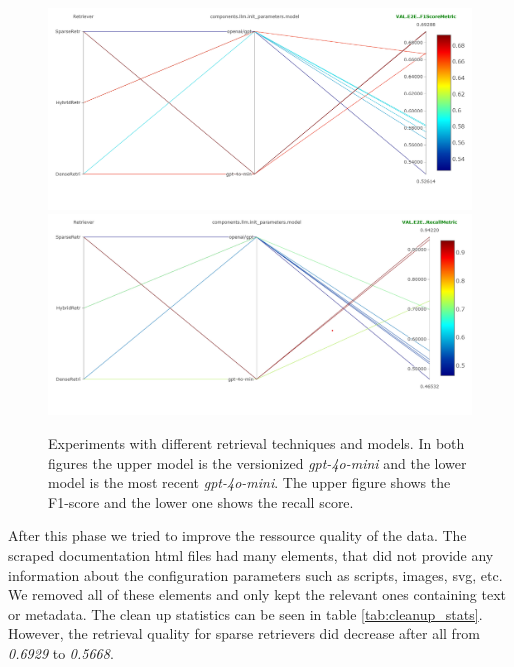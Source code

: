 \begin{figure}[!ht]
    \centering
    \includegraphics[width=\textwidth]{images/RetrievalTypes-vs-LLM-f1.png}\\[6pt]
    \includegraphics[width=\textwidth]{images/RetrievalTypes-vs-LLM-Recall.png}
    \caption{Experiments with different retrieval techniques and models. In both figures the upper model is the versionized \textit{gpt-4o-mini} and the lower model is the most recent \textit{gpt-4o-mini}. The upper figure shows the F1-score and the lower one shows the recall score.}
    \label{fig:conf-phase-0-retrievers}
\end{figure}

After this phase we tried to improve the ressource quality of the data. The scraped documentation html files had many elements, that did not provide any information about the configuration parameters such as scripts, images, svg, etc. We removed all of these elements and only kept the relevant ones containing text or metadata. The clean up statistics can be seen in table \ref{tab:cleanup_stats}. However, the retrieval quality for sparse retrievers did decrease after all from \textit{0.6929} to \textit{0.5668}. 

